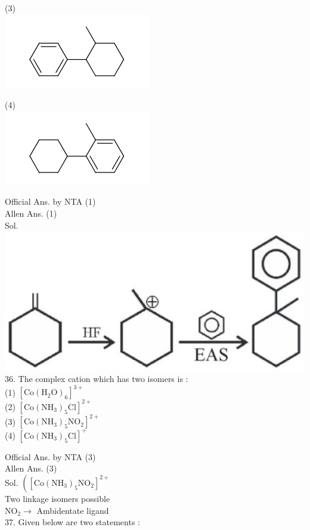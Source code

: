 \documentclass[10pt]{article}
\begin{document}
(3)\\
\includegraphics{smile-5eb068649fd86b4920bf17040d8ab04b2aec3960}

(4)\\
\includegraphics{smile-f47aa959dc8e7555b88409bb64f9a878d4203353}

Official Ans. by NTA (1)\\
Allen Ans. (1)\\
Sol.\\
\includegraphics[max width=\textwidth, center]{2025_10_02_a54bf82dc4585184bb5fg-1(6)}\\
36. The complex cation which has two isomers is :\\
(1) \(\left[\mathrm{Co}\left(\mathrm{H}_{2} \mathrm{O}\right)_{6}\right]^{3+}\)\\
(2) \(\left[\mathrm{Co}\left(\mathrm{NH}_{3}\right)_{5} \mathrm{Cl}\right]^{2+}\)\\
(3) \(\left[\mathrm{Co}\left(\mathrm{NH}_{3}\right)_{5} \mathrm{NO}_{2}\right]^{2+}\)\\
(4) \(\left[\mathrm{Co}\left(\mathrm{NH}_{3}\right)_{5} \mathrm{Cl}\right]^{+}\)

Official Ans. by NTA (3)\\
Allen Ans. (3)\\
Sol. \(\left(\left[\mathrm{Co}\left(\mathrm{NH}_{3}\right)_{5} \mathrm{NO}_{2}\right]^{2+}\right.\)\\
Two linkage isomers possible\\
\(\mathrm{NO}_{2} \rightarrow\) Ambidentate ligand\\
37. Given below are two statements :
\end{document}
